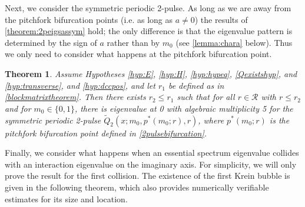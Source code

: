 \documentclass[12pt]{elsarticle}
\theoremstyle{plain}
\newtheorem{theorem}{Theorem}
\theoremstyle{definition}
\theoremstyle{remark}
\numberwithin{theorem}{section}
\numberwithin{equation}{section}
\begin{document}
Next, we consider the symmetric periodic 2-pulse. As long as we are away from the pitchfork bifurcation points (i.e. as long as $a \neq 0$) the results of \cref{theorem:2peigsassym} hold; the only difference is that the eigenvalue pattern is determined by the sign of $a$ rather than by $m_0$ (see \cref{lemma:chara} below). Thus we only need to consider what happens at the pitchfork bifurcation point.

\begin{theorem}\label{theorem:2peigssym}
Assume Hypotheses \ref{hyp:E}, \ref{hyp:H}, \ref{hyp:hypeq}, \ref{Qexistshyp}, and \ref{hyp:transverse}, and \ref{hyp:dccpos}, and let $r_1$ be defined as in \cref{blockmatrixtheorem}. Then there exists $r_2 \leq r_1$ such that for all $r \in \mathcal{R}$ with $r \leq r_2$ and for $m_0 \in \{0, 1\}$, there is eigenvalue at 0 with algebraic multiplicity 5 for the symmetric periodic 2-pulse $\tilde{Q}_2(x; m_0, p^*(m_0; r), r)$, where $p^*(m_0; r)$ is the pitchfork bifurcation point defined in \cref{2pulsebifurcation}.
\end{theorem}

Finally, we consider what happens when an essential spectrum eigenvalue collides with an interaction eigenvalue on the imaginary axis. For simplicity, we will only prove the result for the first collision. The existence of the first Krein bubble is given in the following theorem, which also provides numerically verifiable estimates for its size and location. 
\end{document}
